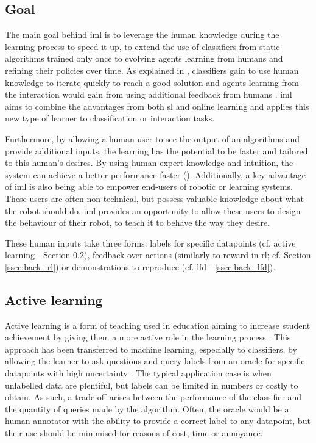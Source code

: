 \subsection{Goal}

The main goal behind \gls{iml} is to leverage the human knowledge during the learning process to speed it up, to extend the use of classifiers from static algorithms trained only once to evolving agents learning from humans and refining their policies over time. As explained in \cite{fails2003interactive}, classifiers gain to use human knowledge to iterate quickly to reach a good solution and agents learning from the interaction would gain from using additional feedback from humans \citep{thomaz2008teachable,knox2009interactively}. \gls{iml} aims to combine the advantages from both \gls{sl} and online learning and applies this new type of learner to classification or interaction tasks.

Furthermore, by allowing a human user to see the output of an algorithms and provide additional inputs, the learning has the potential to be faster and tailored to this human's desires. By using human expert knowledge and intuition, the system can achieve a better performance faster (\citep{thomaz2008teachable}). Additionally, a key advantage of \gls{iml} is also being able to empower end-users of robotic or learning systems. These users are often non-technical, but possess valuable knowledge about what the robot should do. \gls{iml} provides an opportunity to allow these users to design the behaviour of their robot, to teach it to behave the way they desire.

These human inputs take three forms: labels for specific datapoints (cf. active learning - Section \ref{ssec:back_active}), feedback over actions (similarly to reward in \gls{rl}; cf. Section \ref{ssec:back_rl}) or demonstrations to reproduce (cf. \gls{lfd} - \ref{ssec:back_lfd}).

\subsection{Active learning} \label{ssec:back_active}

Active learning is a form of teaching used in education aiming to increase student achievement by giving them a more active role in the learning process \citep{johnson1991active}. This approach has been transferred to machine learning, especially to classifiers, by allowing the learner to ask questions and query labels from an oracle for specific datapoints with high uncertainty \citep{settles2012active}. The typical application case is when unlabelled data are plentiful, but labels can be limited in numbers or costly to obtain. As such, a trade-off arises between the performance of the classifier and the quantity of queries made by the algorithm. Often, the oracle would be a human annotator with the ability to provide a correct label to any datapoint, but their use should be minimised for reasons of cost, time or annoyance.

